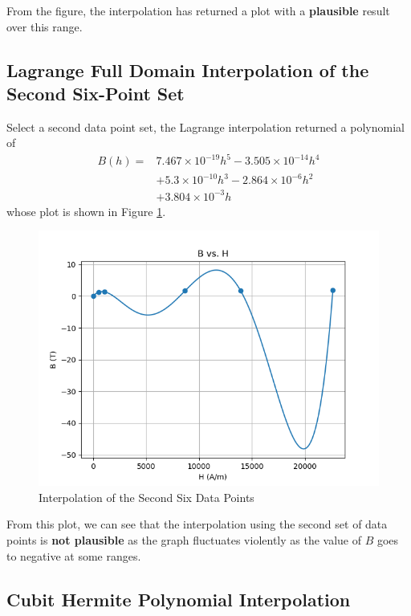 \documentclass[a4paper,titlepage]{article}
\begin{document}
			From the figure, the interpolation has returned a plot with a \textbf{plausible} result over this range. 
		\subsection{Lagrange Full Domain Interpolation of the Second Six-Point Set}
			Select a second data point set, the Lagrange interpolation returned a polynomial of 
			\begin{align*}
				B(h) = &7.467\times 10^{-19}h^5 - 3.505\times 10^{-14}h^4 \\
					   &+ 5.3\times 10^{-10}h^3 - 2.864\times 10^{-6}h^2 \\
					   &+ 3.804\times 10^{-3}h
			\end{align*}
			whose plot is shown in Figure \ref{bh_second6}. 
			\begin{figure}[!h]
				\centering
				\includegraphics[width=\linewidth]{../data/B_H_second_six}
				\caption{Interpolation of the Second Six Data Points}
				\label{bh_second6}
			\end{figure}
			
			From this plot, we can see that the interpolation using the second set of data points is \textbf{not plausible} as the graph fluctuates violently as the value of $B$ goes to negative at some ranges. 		
		
		\subsection{Cubit Hermite Polynomial Interpolation}
			
\end{document}
